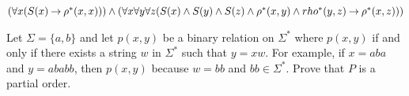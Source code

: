 \documentclass[addpoints]{exam}
\begin{document}
\begin{questions}
\begin{solution}
$(\forall x (S(x) \mathbin{\rightarrow} \rho^*(x,x))) \land (\forall x\forall y \forall z (S(x)
      \land S(y) \land S(z) \land \rho^*(x,y) \land rho^*(y,z) \mathbin{\rightarrow} \rho^*(x,z)))$
\end{solution}
\vspace{5mm}


\bonusquestion[4] 
Let $\Sigma = \{a,b\}$ and let $p(x,y)$ be a binary relation on $\Sigma^*$ 
where $p(x,y)$ if and only if there exists a string $w$ in $\Sigma^*$ such that $y = xw$.
For example, if $x = aba$ and $y = ababb$, then $p(x,y)$ because $w = bb$
and $bb \in \Sigma^*$.  Prove that $P$ is a partial order.
\vspace{30mm}








\end{questions}
\end{document}
